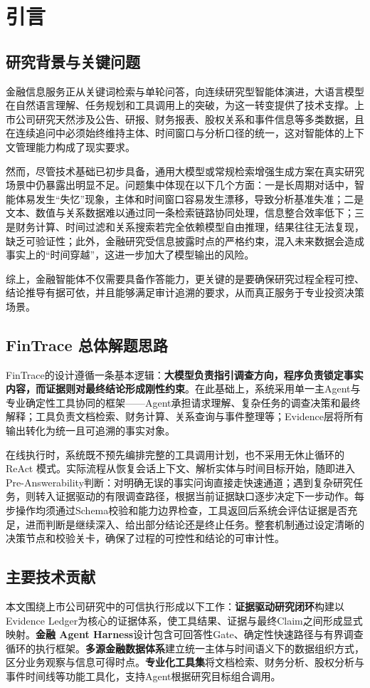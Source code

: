 \section{引言}
\label{sec:introduction}

\subsection{研究背景与关键问题}

金融信息服务正从关键词检索与单轮问答，向连续研究型智能体演进，大语言模型在自然语言理解、任务规划和工具调用上的突破，为这一转变提供了技术支撑。上市公司研究天然涉及公告、研报、财务报表、股权关系和事件信息等多类数据，且在连续追问中必须始终维持主体、时间窗口与分析口径的统一，这对智能体的上下文管理能力构成了现实要求。

然而，尽管技术基础已初步具备，通用大模型或常规检索增强生成方案在真实研究场景中仍暴露出明显不足。问题集中体现在以下几个方面：一是长周期对话中，智能体易发生“失忆”现象，主体和时间窗口容易发生漂移，导致分析基准失准；二是文本、数值与关系数据难以通过同一条检索链路协同处理，信息整合效率低下；三是财务计算、时间过滤和关系搜索若完全依赖模型自由推理，结果往往无法复现，缺乏可验证性；此外，金融研究受信息披露时点的严格约束，混入未来数据会造成事实上的“时间穿越”，这进一步加大了模型输出的风险。

综上，金融智能体不仅需要具备作答能力，更关键的是要确保研究过程全程可控、结论推导有据可依，并且能够满足审计追溯的要求，从而真正服务于专业投资决策场景。

\subsection{FinTrace 总体解题思路}

FinTrace的设计遵循一条基本逻辑：\textbf{大模型负责指引调查方向，程序负责锁定事实内容，而证据则对最终结论形成刚性约束}。在此基础上，系统采用单一主Agent与专业确定性工具协同的框架——Agent承担请求理解、复杂任务的调查决策和最终解释；工具负责文档检索、财务计算、关系查询与事件整理等；Evidence层将所有输出转化为统一且可追溯的事实对象。

在线执行时，系统既不预先编排完整的工具调用计划，也不采用无休止循环的ReAct 模式。实际流程从恢复会话上下文、解析实体与时间目标开始，随即进入Pre-Answerability判断：对明确无误的事实问询直接走快速通道；遇到复杂研究任务，则转入证据驱动的有限调查路径，根据当前证据缺口逐步决定下一步动作。每步操作均须通过Schema校验和能力边界检查，工具返回后系统会评估证据是否充足，进而判断是继续深入、给出部分结论还是终止任务。整套机制通过设定清晰的决策节点和校验关卡，确保了过程的可控性和结论的可审计性。

\subsection{主要技术贡献}

本文围绕上市公司研究中的可信执行形成以下工作：\textbf{证据驱动研究闭环}构建以Evidence Ledger为核心的证据体系，使工具结果、证据与最终Claim之间形成显式映射。\textbf{金融 Agent Harness}设计包含可回答性Gate、确定性快速路径与有界调查循环的执行框架。\textbf{多源金融数据体系}建立统一主体与时间语义下的数据组织方式，区分业务观察与信息可得时点。\textbf{专业化工具集}将文档检索、财务分析、股权分析与事件时间线等功能工具化，支持Agent根据研究目标组合调用。
